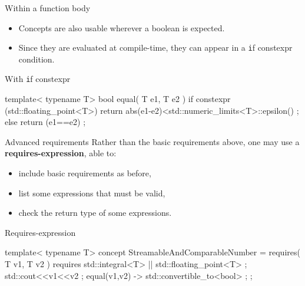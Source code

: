 \begin{frame}[fragile]
    \begin{block}{Within a function body}
      \begin{itemize}
        \item Concepts are also usable wherever a boolean is expected.
        \item Since they are evaluated at compile-time, they can appear in a {\texttt if constexpr} condition.
      \end{itemize}
    \end{block}
    \begin{exampleblock}{With {\texttt if constexpr}}
      \scriptsize
      \begin{cppcode*}{}
      template< typename T>
      bool equal( T e1, T e2 )
      {
        if constexpr (std::floating_point<T>)
        { return abs(e1-e2)<std::numeric_limits<T>::epsilon() ; }
        else
        { return (e1==e2) ; }
      }
      \end{cppcode*}
    \end{exampleblock}
\end{frame}

\begin{frame}[fragile]
    \begin{block}{Advanced requirements}
        Rather than the basic requirements above, one may use a \textbf{requires-expression}, able to:
        \begin{itemize}
            \item include basic requirements as before,
            \item list some expressions that must be valid,
            \item check the return type of some expressions.
        \end{itemize}
    \end{block}
    \begin{exampleblock}{Requires-expression}
      \scriptsize
      \begin{cppcode*}{}
      template< typename T>
      concept StreamableAndComparableNumber = requires( T v1, T v2 )
       {
        requires std::integral<T> || std::floating_point<T> ;
        std::cout<<v1<<v2 ;
        { equal(v1,v2) } -> std::convertible_to<bool> ;
       } ;
      \end{cppcode*}
    \end{exampleblock}
\end{frame}

